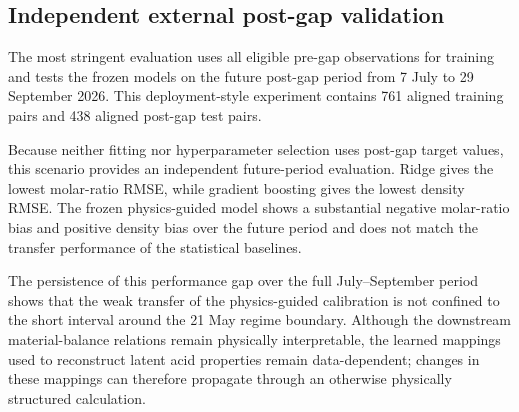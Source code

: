 \documentclass[11pt]{article}
\begin{document}
\subsection{Independent external post-gap validation}

The most stringent evaluation uses all eligible pre-gap observations for training and tests the frozen models on the future post-gap period from 7 July to 29 September 2026. This deployment-style experiment contains 761 aligned training pairs and 438 aligned post-gap test pairs.

\begin{table}[htbp]
\centering
\caption{Strict external post-gap validation (\texttt{external\_transfer\_full}).}
\label{tab:externaltransfer}
\end{table}

Because neither fitting nor hyperparameter selection uses post-gap target values, this scenario provides an independent future-period evaluation. Ridge gives the lowest molar-ratio RMSE, while gradient boosting gives the lowest density RMSE. The frozen physics-guided model shows a substantial negative molar-ratio bias and positive density bias over the future period and does not match the transfer performance of the statistical baselines.

The persistence of this performance gap over the full July--September period shows that the weak transfer of the physics-guided calibration is not confined to the short interval around the 21 May regime boundary. Although the downstream material-balance relations remain physically interpretable, the learned mappings used to reconstruct latent acid properties remain data-dependent; changes in these mappings can therefore propagate through an otherwise physically structured calculation.
\end{document}
